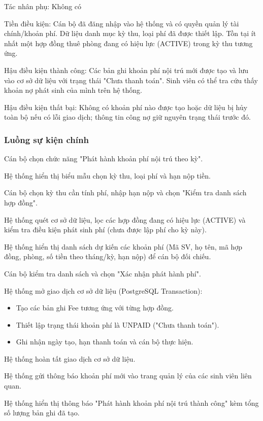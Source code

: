 Tác nhân phụ: Không có

Tiền điều kiện: Cán bộ đã đăng nhập vào hệ thống và có quyền quản lý tài chính/khoản phí. Dữ liệu danh mục kỳ thu, loại phí đã được thiết lập. Tồn tại ít nhất một hợp đồng thuê phòng đang có hiệu lực (ACTIVE) trong kỳ thu tương ứng.

Hậu điều kiện thành công: Các bản ghi khoản phí nội trú mới được tạo và lưu vào cơ sở dữ liệu với trạng thái "Chưa thanh toán". Sinh viên có thể tra cứu thấy khoản nợ phát sinh của mình trên hệ thống.

Hậu điều kiện thất bại: Không có khoản phí nào được tạo hoặc dữ liệu bị hủy toàn bộ nếu có lỗi giao dịch; thông tin công nợ giữ nguyên trạng thái trước đó.

\subsubsection{Luồng sự kiện chính}

Cán bộ chọn chức năng "Phát hành khoản phí nội trú theo kỳ".

Hệ thống hiển thị biểu mẫu chọn kỳ thu, loại phí và hạn nộp tiền.

Cán bộ chọn kỳ thu cần tính phí, nhập hạn nộp và chọn "Kiểm tra danh sách hợp đồng".

Hệ thống quét cơ sở dữ liệu, lọc các hợp đồng đang có hiệu lực (ACTIVE) và kiểm tra điều kiện phát sinh phí (chưa được lập phí cho kỳ này).

Hệ thống hiển thị danh sách dự kiến các khoản phí (Mã SV, họ tên, mã hợp đồng, phòng, số tiền theo tháng/kỳ, hạn nộp) để cán bộ đối chiếu.

Cán bộ kiểm tra danh sách và chọn "Xác nhận phát hành phí".

Hệ thống mở giao dịch cơ sở dữ liệu (PostgreSQL Transaction):

\begin{itemize}[leftmargin=1.4em]
\item Tạo các bản ghi Fee tương ứng với từng hợp đồng.
\item Thiết lập trạng thái khoản phí là UNPAID ("Chưa thanh toán").
\item Ghi nhận ngày tạo, hạn thanh toán và cán bộ thực hiện.
\end{itemize}

Hệ thống hoàn tất giao dịch cơ sở dữ liệu.

Hệ thống gửi thông báo khoản phí mới vào trang quản lý của các sinh viên liên quan.

Hệ thống hiển thị thông báo "Phát hành khoản phí nội trú thành công" kèm tổng số lượng bản ghi đã tạo.

